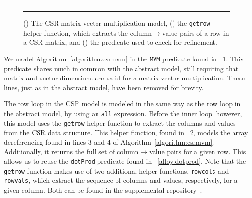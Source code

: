 \documentclass[sigconf]{acmart}
\begin{document}
\begin{figure}
\begin{subfigure}[b]{0.5\textwidth}
  \centering
  
  \caption{}
  \label{alloy:mvmcsr}
\end{subfigure}
{\color{lightgray}\rule{0.4\textwidth}{0.1pt}}
\par\bigskip
\begin{subfigure}[b]{0.5\textwidth}
  \centering
  
  \caption{}
  \label{alloy:getrow}
\end{subfigure}
{\color{lightgray}\rule{0.4\textwidth}{0.1pt}}
\par\bigskip
\begin{subfigure}[b]{0.5\textwidth}
  \centering
  
  \caption{}
  \label{alloy:mvmcsrref}
\end{subfigure}
\caption{() The CSR matrix-vector multiplication model, () the \texttt{getrow} helper function, which extracts the column$\rightarrow$value pairs of a row in a CSR matrix, and () the predicate used to check for refinement.}
\end{figure}

We model Algorithm~\ref{algorithm:csrmvm} in the \texttt{MVM} predicate found in \figurename~\ref{alloy:mvmcsr}.  This predicate shares much in common with the abstract model, still requiring that matrix and vector dimensions are valid for a matrix-vector multiplication.  These lines, just as in the abstract model, have been removed for brevity.

The row loop in the CSR model is modeled in the same way as the row loop in the abstract model, by using an \texttt{all} expression.  Before the inner loop, however, this model uses the \texttt{getrow} helper function to extract the columns and values from the CSR data structure.  This helper function, found in \figurename~\ref{alloy:getrow}, models the array dereferencing found in lines 3 and 4 of Algorithm~\ref{algorithm:csrmvm}.  Additionally, it returns the full set of column$\rightarrow$value pairs for a given row.  This allows us to reuse the \texttt{dotProd} predicate found in \figurename~\ref{alloy:dotprod}.  Note that the \texttt{getrow} function makes use of two additional helper functions, \texttt{rowcols} and \texttt{rowvals}, which extract the sequence of columns and values, respectively, for a given column.  Both can be found in the supplemental repository~\cite{repository}.
\end{document}
